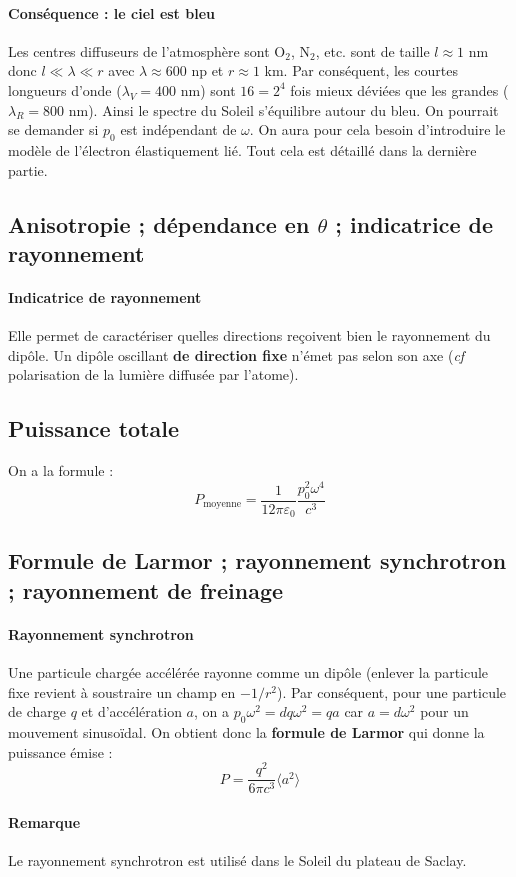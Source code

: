 \documentclass[french]{book}
\theoremstyle{plain}
\theoremstyle{definition}
\theoremstyle{remark}
\begin{document}
\paragraph{Conséquence : le ciel est bleu}
Les centres diffuseurs de l'atmosphère sont O$_2$, N$_2$, etc. sont de taille $l\approx1$ nm donc $l\ll\lambda\ll r$ avec $\lambda\approx600$ np et $r\approx1$ km. Par conséquent, les courtes longueurs d'onde ($\lambda_V=400$ nm) sont $16=2^4$ fois mieux déviées que les grandes ($\lambda_R=800$ nm). Ainsi le spectre du Soleil s'équilibre autour du bleu. On pourrait se demander si $p_0$ est indépendant de $\omega$. On aura pour cela besoin d'introduire le modèle de l'électron élastiquement lié. Tout cela est détaillé dans la dernière partie.
\subsection{Anisotropie ; dépendance en $\theta$ ; indicatrice de rayonnement}
\paragraph{Indicatrice de rayonnement} Elle permet de caractériser quelles directions reçoivent bien le rayonnement du dipôle. Un dipôle oscillant \textbf{de direction fixe} n'émet pas selon son axe (\textit{cf} polarisation de la lumière diffusée par l'atome).
\subsection{Puissance totale}
On a la formule : $$P_\text{moyenne}=\frac{1}{12\pi\varepsilon_0}\frac{p_0^2\omega^4}{c^3}$$
\subsection{Formule de Larmor ; rayonnement synchrotron ; rayonnement de freinage}
\paragraph{Rayonnement synchrotron} Une particule chargée accélérée rayonne comme un dipôle (enlever la particule fixe revient à soustraire un champ en $-1/r^2$). Par conséquent, pour une particule de charge $q$ et d’accélération $a$, on a $p_0\omega^2=dq\omega^2=qa$ car $a = d\omega^2$ pour un mouvement sinusoïdal. On obtient donc la \textbf{formule de Larmor} qui donne la puissance émise : $$P=\frac{q^2}{6\pi c^3}\langle a^2\rangle$$
\paragraph{Remarque} Le rayonnement synchrotron est utilisé dans le Soleil du plateau de Saclay.
\end{document}
